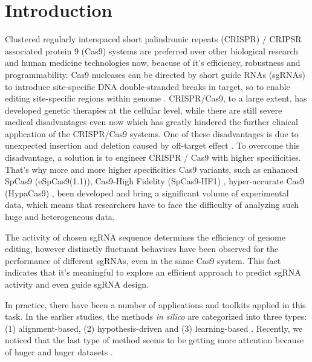 \documentclass{bioinfo}
\begin{document}
\maketitle

\section{Introduction}

Clustered regularly interspaced short palindromic repeats (CRISPR) / CRIPSR associated protein 9 (Cas9) systems are preferred over other biological research and human medicine technologies now, 
beacuse of it's efficiency, robustness and programmability. 
Cas9 nucleases can be directed by short guide RNAs (sgRNAs) to introduce site-specific DNA double-stranded breaks in target, 
so to enable editing site-specific regions within genome \citep{jinek2012a,cong2013multiplex,mali2013rnaguided}. 
CRISPR/Cas9, to a large extent, has developed genetic therapies at the cellular level, 
while there are still severe medical disadvantages even now which has greatly hindered the further clinical application of the CRISPR/Cas9 systems. 
One of these disadvantages is due to unexpected insertion and deletion caused by off-target effect \citep{rubeis2018risks,kang2016introducing,ishii2017reproductive,liang2015crispr/cas9-mediated}. 
To overcome this disadvantage, a solution is to engineer CRISPR / Cas9 with higher specificities. 
That's why more and more higher specificities Cas9 variants, such as enhanced SpCas9 (eSpCas9(1.1)), 
Cas9-High Fidelity (SpCas9-HF1) \citep{slaymaker2016rationally,ishii2017reproductive}, hyper-accurate Cas9 (HypaCas9) \citep{kleinstiver2016high-fidelity}, 
been developed and bring a significant volume of experimental data, which means that researchers have to face the difficulty of analyzing such huge and heterogeneous data.

The activity of chosen sgRNA sequence determines the efficiency of genome editing, 
however distinctly fluctuant behaviors have been observed for the performance of different sgRNAs, even in the same Cas9 system. 
This fact indicates that it's meaningful to explore an efficient approach to predict sgRNA activity and even guide sgRNA design. 

In practice, there have been a number of applications and toolkits applied in this task. In the earlier studies, the methods \emph{in silico} are categorized into three types: 
(1) alignment-based, (2) hypothesis-driven and (3) learning-based \citep{chuai2018deepcrispr}. 
Recently, we noticed that the last type of method seems to be getting more attention because of huger and huger datasets \citep{liu2019computational}. 
\end{document}
